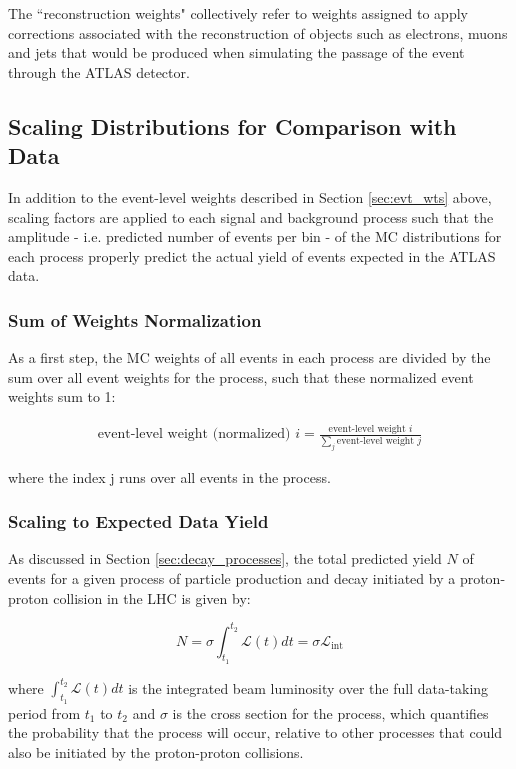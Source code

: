 The ``reconstruction weights" collectively refer to weights assigned to apply corrections associated with the reconstruction of objects such as electrons, muons and jets that would be produced when simulating the passage of the event through the ATLAS detector.

\subsection{Scaling Distributions for Comparison with Data}

In addition to the event-level weights described in Section \ref{sec:evt_wts} above, scaling factors are applied to each signal and background process such that the amplitude - i.e. predicted number of events per bin - of the MC distributions for each process properly predict the actual yield of events expected in the ATLAS data. 

\subsubsection{Sum of Weights Normalization}

As a first step, the MC weights of all events in each process are divided by the sum over all event weights for the process, such that these normalized event weights sum to 1: 

\begin{multline}
\label{eq:evt_wt_norm}
\text{event-level weight (normalized) }i =\frac{\text{event-level weight }i }{\sum_j \text{event-level weight }j }
\end{multline}

\noindent where the index j runs over all events in the process.

\subsubsection{Scaling to Expected Data Yield}

As discussed in Section \ref{sec:decay_processes}, the total predicted yield \(N\) of events for a given process of particle production and decay initiated by a proton-proton collision in the LHC is given by:

\begin{equation}
\label{eq:predicted_yield}
N = \sigma\int_{t_1}^{t_2}\mathcal{L}(t)dt = \sigma\mathcal{L}_\text{int}
\end{equation}

\noindent where \(\int_{t_1}^{t_2}\mathcal{L}(t)dt\) is the integrated beam luminosity over the full data-taking period from \(t_1\) to \(t_2\) and \(\sigma\) is the cross section for the process, which quantifies the probability that the process will occur, relative to other processes that could also be initiated by the proton-proton collisions. 

